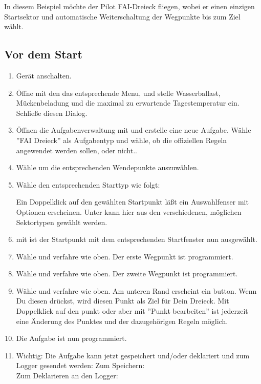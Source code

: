 In diesem Beispiel möchte der Pilot FAI-Dreieck fliegen, wobei er einen einzigen
Startsektor und automatische Weiterschaltung der Wegpunkte bis zum Ziel wählt.

\subsection*{Vor dem Start}
\begin{enumerate}
\item  Gerät anschalten.
\item  Öffne mit den   das entsprechende Menu,
und stelle Wasserballast, Mückenbeladung und die maximal zu erwartende  Tagestemperatur ein. Schließe diesen Dialog.
\item  Öffnen die Aufgabenverwaltung  mit 
 und erstelle eine neue  Aufgabe. Wähle  ''FAI Dreieck'' als Aufgabentyp und wähle,
ob die offiziellen Regeln angewendet werden sollen, oder nicht..
\item  Wähle  um die entsprechenden Wendepunkte auszuwählen.
\item Wähle den entsprechenden Starttyp wie folgt:

Ein Doppelklick auf den gewählten Startpunkt  läßt ein Auswahlfenser mit Optionen erscheinen. Unter  kann
hier aus den verschiedenen, möglichen  Sektortypen gewählt werden.
\item mit  ist der Startpunkt mit dem entsprechenden Startfenster nun ausgewählt.
\item  Wähle  und verfahre wie oben. Der erste Wegpunkt ist programmiert.
\item  Wähle  und verfahre wie oben. Der zweite Wegpunkt ist programmiert.
\item  Wähle  und verfahre wie oben. Am unteren Rand erscheint ein button.
Wenn Du diesen drückst, wird \xc diesen Punkt als Ziel für Dein Dreieck. Mit Doppelklick auf den punkt oder aber mit ''Punkt bearbeiten'' ist jederzeit eine
Änderung des Punktes und der dazugehörigen Regeln möglich.
\item  Die Aufgabe ist nun programmiert.
\item Wichtig:
Die Aufgabe kann jetzt gespeichert und/oder deklariert und zum Logger gesendet werden:
Zum Speichern:  \\
Zum Deklarieren an den Logger: 
\end{enumerate}

